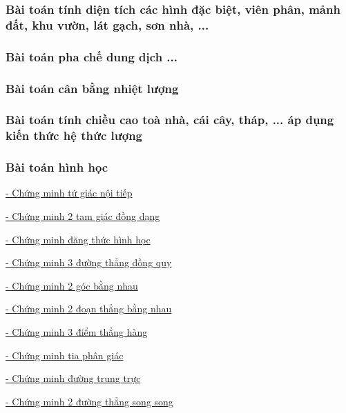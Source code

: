 \documentclass[12pt]{article}
\begin{document}
\subsubsection{Bài toán tính diện tích các hình đặc biệt, viên phân, mảnh đất, khu vườn, lát gạch, sơn nhà, ...}

\subsubsection{Bài toán pha chế dung dịch ...}

\subsubsection{Bài toán cân bằng nhiệt lượng}

\subsubsection{Bài toán tính chiều cao toà nhà, cái cây, tháp, ... áp dụng kiến thức hệ thức lượng}

\subsubsection{Bài toán hình học}

\underline{- Chứng minh tứ giác nội tiếp} \par

\underline{- Chứng minh 2 tam giác đồng dạng} \par

\underline{- Chứng minh đăng thức hình học} \par

\underline{- Chứng minh 3 đường thẳng đồng quy} \par

\underline{- Chứng minh 2 góc bằng nhau} \par

\underline{- Chứng minh 2 đoạn thẳng bằng nhau} \par

\underline{- Chứng minh 3 điểm thẳng hàng} \par

\underline{- Chứng minh tia phân giác} \par

\underline{- Chứng minh đường trung trực} \par

\underline{- Chứng minh 2 đường thẳng song song} \par
\end{document}
